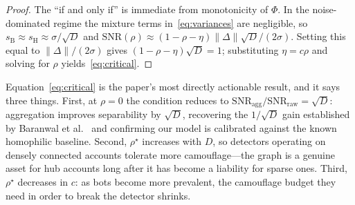 \documentclass[../elsevier.tex]{subfiles}
\begin{document}
\begin{proof}
The ``if and only if'' is immediate from monotonicity of $\Phi$. In the
noise-dominated regime the mixture terms in~\eqref{eq:variances} are negligible, so
$s_{\mathrm{B}} \approx s_{\mathrm{H}} \approx \sigma/\sqrt{D}$ and
$\mathrm{SNR}(\rho) \approx (1-\rho-\eta)\|\Delta\|\sqrt{D}/(2\sigma)$. Setting this
equal to $\|\Delta\|/(2\sigma)$ gives $(1-\rho-\eta)\sqrt{D} = 1$; substituting
$\eta = c\rho$ and solving for $\rho$ yields~\eqref{eq:critical}.
\end{proof}

Equation~\eqref{eq:critical} is the paper's most directly actionable result, and it
says three things. First, at $\rho = 0$ the condition reduces to
$\mathrm{SNR}_{\mathrm{agg}}/\mathrm{SNR}_{\mathrm{raw}} = \sqrt{D}$: aggregation
improves separability by $\sqrt{D}$, recovering the $1/\sqrt{D}$ gain established
by Baranwal et al.~\citeyearpar{baranwal2021graph} and confirming our model is calibrated
against the known homophilic baseline. Second, $\rho^\star$ increases with $D$, so
detectors operating on densely connected accounts tolerate more camouflage---the
graph is a genuine asset for hub accounts long after it has become a liability for
sparse ones. Third, $\rho^\star$ decreases in $c$: as bots become more prevalent,
the camouflage budget they need in order to break the detector shrinks.
\end{document}
